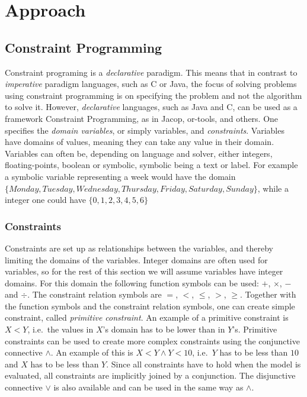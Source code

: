 \chapter{Approach}\label{cha:approach}

\section{Constraint Programming}
Constraint programing is a \emph{declarative} paradigm. This means that in contrast to \emph{imperative} paradigm languages, such as C or Java, the focus of solving problems using constraint programming is on specifying the problem and not the algorithm to solve it. However, \emph{declarative} languages, such as Java and C, can be used as a framework Constraint Programming, as in Jacop, or-tools, and others. One specifies the \emph{domain variables}, or simply variables, and \emph{constraints}. Variables have domains of values, meaning they can take any value in their domain. Variables can often be, depending on language and solver, either integers, floating-points, boolean or symbolic, symbolic being a text or label. For example a symbolic variable representing a week would have the domain\\
$\{Monday,Tuesday, Wednesday, Thursday, Friday, Saturday, Sunday\}$, while a integer one could have $\{0,1,2,3,4,5,6\}$

\subsection{Constraints}
Constraints are set up as relationships between the variables, and thereby limiting the domains of the variables. Integer domains are often used for variables, so for the rest of this section we will assume variables have integer domains. For this domain the following function symbols can be used: $+$, $\times$, $-$ and $\div$. The constraint relation symbols are $=$, $<$, $\leq$, $>$, $\geq$. Together with the function symbols and the constraint relation symbols, one can create simple constraint, called \emph{primitive constraint}. An example of a primitive constraint is $X < Y$, i.e.\ the values in $X$'s domain has to be lower than in $Y$'s. Primitive constraints can be used to create more complex constraints using the conjunctive connective $\land$. An example of this is $X < Y \land Y < 10$, i.e.\ $Y$ has to be less than $10$ and $X$ has to be less than $Y$. Since all constraints have to hold when the model is evaluated, all constraints are implicitly joined by a conjunction. The disjunctive connective $\lor$ is also available and can be used in the same way as $\land$. 

